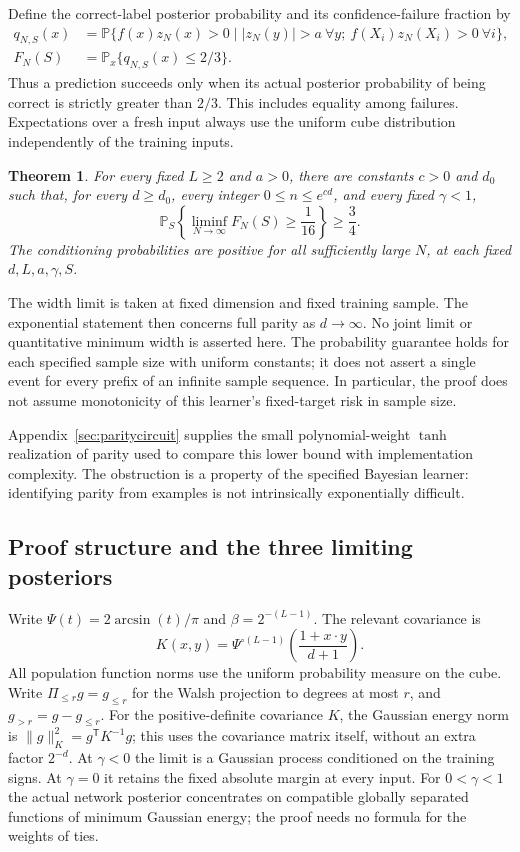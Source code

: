 \documentclass[11pt]{article}
\newtheorem{theorem}{Theorem}[section]
\theoremstyle{remark}\newtheorem{remark}[theorem]{Remark}
\begin{document}
Define the correct-label posterior probability and its confidence-failure
fraction by
\begin{align*}
 q_{N,S}(x)&=\mathbb P\{f(x)z_N(x)>0\mid
       |z_N(y)|>a\ \forall y;\ f(X_i)z_N(X_i)>0\ \forall i\},\\
 F_N(S)&=\mathbb P_x\{q_{N,S}(x)\le2/3\}.
\end{align*}
Thus a prediction succeeds only when its actual posterior probability of
being correct is strictly greater than $2/3$. This includes equality among
failures. Expectations over a fresh input always use the uniform cube
distribution independently of the training inputs.

\begin{theorem}\label{thm:main}
For every fixed $L\ge2$ and $a>0$, there are constants $c>0$ and $d_0$
such that, for every $d\ge d_0$, every integer $0\le n\le e^{cd}$, and
every fixed $\gamma<1$,
\[
 \mathbb P_S\!\left\{\liminf_{N\to\infty}F_N(S)\ge\frac1{16}\right\}
 \ge\frac34.
\]
The conditioning probabilities are positive for all sufficiently large
$N$, at each fixed $d,L,a,\gamma,S$.
\end{theorem}

The width limit is taken at fixed dimension and fixed training sample.
The exponential statement then concerns full parity as $d\to\infty$. No joint limit
or quantitative minimum width is asserted here. The probability guarantee
holds for each specified sample size with uniform constants; it does not
assert a single event for every prefix of an infinite sample sequence.
In particular, the proof does not assume monotonicity of this learner's
fixed-target risk in sample size.

Appendix~\ref{sec:paritycircuit} supplies the small polynomial-weight
$\tanh$ realization of parity used to compare this lower bound with
implementation complexity. The obstruction is a property of the specified
Bayesian learner: identifying parity from examples is not intrinsically
exponentially difficult.

\subsection{Proof structure and the three limiting posteriors}
Write $\Psi(t)=2\arcsin(t)/\pi$ and $\beta=2^{-(L-1)}$. The relevant
covariance is
\[
 K(x,y)=\Psi^{\circ(L-1)}\!\left(\frac{1+x\cdot y}{d+1}\right).
\]
All population function norms use the uniform probability measure on the
cube. Write $\Pi_{\le r}g=g_{\le r}$ for the Walsh projection to degrees
at most $r$, and $g_{>r}=g-g_{\le r}$. For the positive-definite covariance
$K$, the Gaussian energy norm is $\|g\|_K^2=g^{\mathsf T}K^{-1}g$;
this uses the covariance matrix itself, without an extra factor $2^{-d}$.
At $\gamma<0$ the limit is a Gaussian process conditioned on the training
signs. At $\gamma=0$ it retains the fixed absolute margin at every input.
For $0<\gamma<1$ the actual network posterior concentrates on compatible
globally separated functions of minimum Gaussian energy; the proof needs
no formula for the weights of ties.
\end{document}
